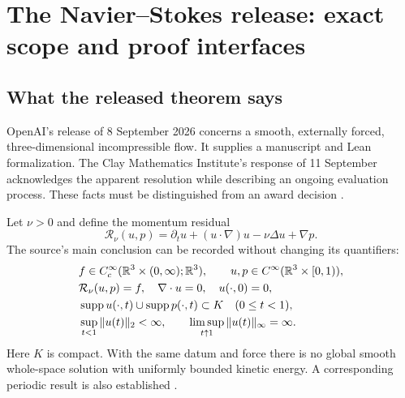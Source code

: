 \chapter{The Navier--Stokes release: exact scope and proof interfaces}
\label{ch:navier-stokes-release}


\section{What the released theorem says}

OpenAI's release of 8 September 2026 concerns a smooth, externally forced,
three-dimensional incompressible flow. It supplies a manuscript and Lean
formalization. The Clay Mathematics Institute's response of 11 September
acknowledges the apparent resolution while describing an ongoing evaluation
process. These facts must be distinguished from an award decision
\citep{NSOpenAIAnnouncement2026,NSClayAnnouncement2026}.

Let $\nu>0$ and define the momentum residual
\begin{equation}
 \mathcal R_\nu(u,p)
 =\partial_tu+(u\cdot\nabla)u-\nu\Delta u+\nabla p.
 \label{eq:ns-residual}
\end{equation}
The source's main conclusion can be recorded without changing its quantifiers:
\begin{align}
 &f\in C_c^\infty(\mathbb{R}^3\times(0,\infty);\mathbb{R}^3),\qquad
 u,p\in C^\infty(\mathbb{R}^3\times[0,1)),\nonumber\\
 &\mathcal R_\nu(u,p)=f,\quad \nabla\cdot u=0,\quad u(\cdot,0)=0,
 \label{eq:ns-release-equation}\\
 &\operatorname{supp} u(\cdot,t)\cup\operatorname{supp} p(\cdot,t)\subset K
 \quad(0\leq t<1),\nonumber\\
 &\sup_{t<1}\|u(t)\|_2<\infty,\qquad
 \limsup_{t\uparrow1}\|u(t)\|_\infty=\infty.
 \label{eq:ns-release-growth}
\end{align}
Here $K$ is compact. With the same datum and force there is no global smooth
whole-space solution with uniformly bounded kinetic energy. A corresponding
periodic result is also established \citep[Theorem 1.1 and Corollary 10.6]{NSOpenAI2026}.

